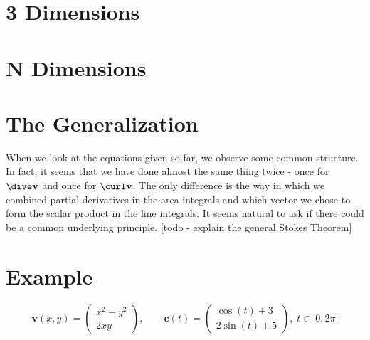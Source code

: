 \section{3 Dimensions}

\section{N Dimensions}

\section{The Generalization}
When we look at the equations given so far, we observe some common structure. In fact, it seems that we have done almost the same thing twice - once for $\dive \mathbf{v}$ and once for $\curl \mathbf{v}$. The only difference is the way in which we combined partial derivatives in the area integrals and which vector we chose to form the scalar product in the line integrals. It seems natural to ask if there could be a common underlying principle. [todo - explain the general Stokes Theorem]




\section{Example}
\begin{equation}
 \mathbf{v}(x,y) = 
 \begin{pmatrix}
 x^2 - y^2 \\
 2 x y
 \end{pmatrix}, \qquad
 \mathbf{c}(t) = 
 \begin{pmatrix}
   \cos(t) + 3 \\
 2 \sin(t) + 5 
 \end{pmatrix}, \; t \in [0, 2 \pi[
\end{equation}













